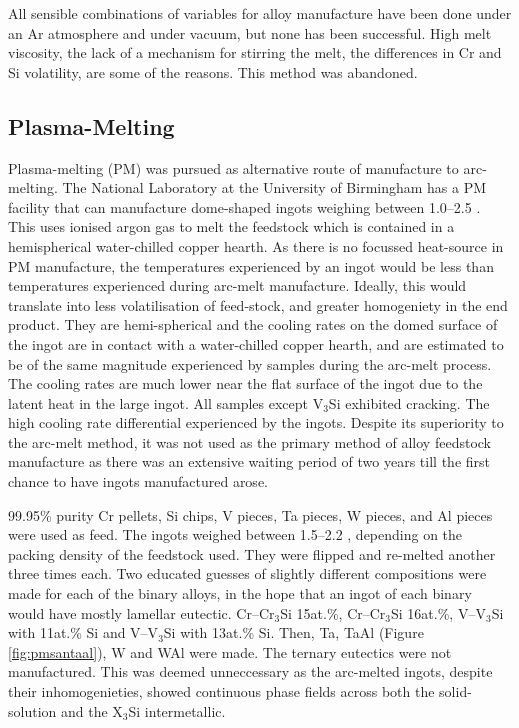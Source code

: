 All sensible combinations of variables for alloy manufacture have been done under an Ar atmosphere and under vacuum, but none has been successful.  High melt viscosity, the lack of a mechanism for stirring the melt, the differences in Cr and Si volatility, are some of the reasons.  This method was abandoned.


\subsection{Plasma-Melting}

Plasma-melting (PM) was pursued as alternative route of manufacture to arc-melting.  The National Laboratory at the University of Birmingham has a PM facility that can manufacture dome-shaped ingots weighing between 1.0--2.5 \kilogram.  This uses ionised argon gas to melt the feedstock which is contained in a hemispherical water-chilled copper hearth.  As there is no focussed heat-source in PM manufacture, the temperatures experienced by an ingot would be less than temperatures experienced during arc-melt manufacture.  Ideally, this would translate into less volatilisation of feed-stock, and greater homogeniety in the end product.  They are hemi-spherical and the cooling rates on the domed surface of the ingot are in contact with a water-chilled copper hearth, and are estimated to be of the same magnitude experienced by samples during the arc-melt process.  The cooling rates are much lower near the flat surface of the ingot due to the latent heat in the large ingot.  All samples except V$_3$Si exhibited cracking.  The high cooling rate differential experienced by the ingots.  Despite its superiority to the arc-melt method, it was not used as the primary method of alloy feedstock manufacture as there was an extensive waiting period of two years till the first chance to have ingots manufactured arose.

99.95\% purity Cr pellets, Si chips, V pieces, Ta pieces, W pieces, and Al pieces were used as feed.  The ingots weighed between 1.5--2.2 \kilogram, depending on the packing density of the feedstock used.  They were flipped and re-melted another three times each.  Two educated guesses of slightly different compositions were made for each of the binary alloys, in the hope that an ingot of each binary would have mostly lamellar eutectic.  Cr--Cr$_3$Si 15at.\%, Cr--Cr$_3$Si 16at.\%, V--V$_3$Si with 11at.\% Si and V--V$_3$Si with 13at.\% Si.  Then, Ta, TaAl (Figure \ref{fig:pmsantaal}), W and WAl were made.  The ternary eutectics were not manufactured.  This was deemed unneccessary as the arc-melted ingots, despite their inhomogenieties, showed continuous phase fields across both the solid-solution and the X$_3$Si  intermetallic. 

